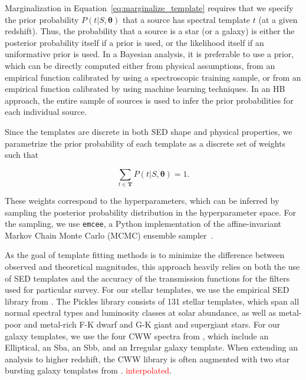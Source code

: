\documentclass[useAMS,usenatbib]{mn2e}
\begin{document}
Marginalization in Equation~\ref{eq:marginalize_template}
requires that we specify the prior probability
$P \left(t | S, \mathbf{\theta} \right)$
that a source has spectral template $t$ (at a given redshift).
Thus, the probability that a source is a star (or a galaxy)
is either the posterior probability itself
if a prior is used,
or the likelihood itself if an uniformative prior is used.
In a Bayesian analysis, it is preferable to use a prior,
which can be directly computed either from physical assumptions,
from an empirical function calibrated by
using a spectroscopic training sample,
or from an empirical function calibrated by
using machine learning techniques.
In an HB approach, the entire sample of sources is used to
infer the prior probabilities for each individual source.

Since the templates are discrete in both SED shape and physical properties,
we parametrize the prior probability of each template
as a discrete set of weights such that

\begin{equation}
\sum_{t \in \mathbf{T}}
P \left(t | S, \mathbf{\theta} \right) = 1.
\end{equation}

\noindent
These weights correspond to the hyperparameters,
which can be inferred by sampling
the posterior probability distribution in the hyperparameter space.
For the sampling, we use \texttt{emcee}, a Python implementation of the
affine-invariant Markov Chain Monte Carlo (MCMC) ensemble sampler~\citep{Foreman-Mackey2013}.  

As the goal of template fitting methods is to minimize
the difference between observed and theoretical magnitudes,
this approach heavily relies on
both the use of SED templates and
the accuracy of the transmission functions
for the filters used for particular survey.
For our stellar templates,
we use the empirical SED library from \cite{pickles1998stellar}.
The Pickles library consists of 131 stellar templates,
which span all normal spectral types
and luminosity classes at solar abundance,
as well as metal-poor and metal-rich F-K dwarf 
and G-K giant and supergiant stars.
For our galaxy templates,
we use the four CWW spectra from \cite{coleman1980colors},
which include an Elliptical, an Sba, an Sbb,
and an Irregular galaxy template.
When extending an analysis to higher redshift,
the CWW library is often augmented with
two star bursting galaxy templates from \cite{kinney1996template}.
\textcolor{red}{interpolated}.
\end{document}
